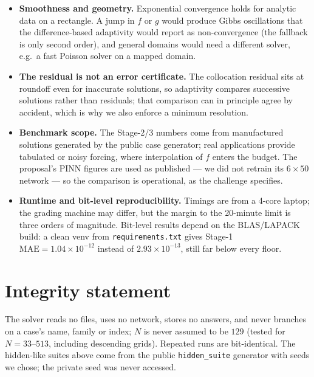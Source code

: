 \documentclass[10pt,a4paper]{article}
\begin{document}
\begin{itemize}
\item \textbf{Smoothness and geometry.} Exponential convergence holds for
  analytic data on a rectangle.  A jump in $f$ or $g$ would produce Gibbs
  oscillations that the difference-based adaptivity would report as
  non-convergence (the fallback is only second order), and general domains would
  need a different solver, e.g.\ a fast Poisson solver on a mapped domain.
\item \textbf{The residual is not an error certificate.} The collocation
  residual sits at roundoff even for inaccurate solutions, so adaptivity
  compares successive solutions rather than residuals; that comparison can in
  principle agree by accident, which is why we also enforce a minimum
  resolution.
\item \textbf{Benchmark scope.} The Stage-2/3 numbers come from manufactured
  solutions generated by the public case generator; real applications provide
  tabulated or noisy forcing, where interpolation of $f$ enters the budget.
  The proposal's PINN figures are used as published --- we did not retrain its
  $6\times50$ network --- so the comparison is operational, as the challenge
  specifies.
\item \textbf{Runtime and bit-level reproducibility.} Timings are from a
  4-core laptop; the grading machine may differ, but the margin to the
  20-minute limit is three orders of magnitude.  Bit-level results depend on
  the BLAS/LAPACK build: a clean venv from \texttt{requirements.txt} gives
  Stage-1 $\mathrm{MAE}=1.04\times10^{-12}$ instead of $2.93\times10^{-13}$,
  still far below every floor.
\end{itemize}

\section{Integrity statement}

The solver reads no files, uses no network, stores no answers, and never
branches on a case's name, family or index; $N$ is never assumed to be $129$
(tested for $N=33$--$513$, including descending grids).  Repeated runs are
bit-identical.  The hidden-like suites above come from the public
\texttt{hidden\_suite} generator with seeds we chose; the private seed was never
accessed.
\end{document}
